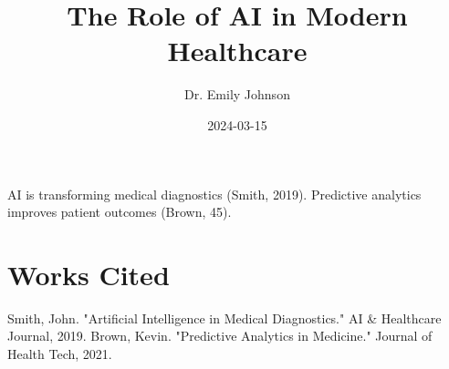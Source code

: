 \documentclass{article}
\title{The Role of AI in Modern Healthcare}
\author{Dr. Emily Johnson}
\date{2024-03-15}
\begin{document}
\maketitle
AI is transforming medical diagnostics (Smith, 2019). Predictive analytics improves patient outcomes (Brown, 45).

\section{Works Cited}
Smith, John. "Artificial Intelligence in Medical Diagnostics." AI \& Healthcare Journal, 2019.
Brown, Kevin. "Predictive Analytics in Medicine." Journal of Health Tech, 2021.
\end{document}

